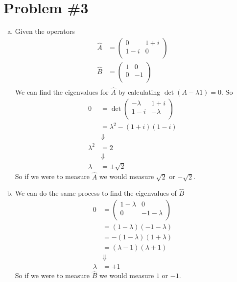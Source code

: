 \documentclass[11pt]{article}
\numberwithin{equation}{section}
\begin{document}
\section{Problem \#3}
\begin{enumerate}[(a)]
\item
Given the operators
\begin{align*}
\hat{A} &= \left(\begin{array}{cc}
              0     &1+i\\
              1-i   &0  \\
           \end{array}\right)\\
\hat{B} &= \left(\begin{array}{cc}
              1     &0\\
              0     &-1\\
           \end{array}\right)\\
\end{align*}
We can find the eigenvalues for $\hat{A}$ by calculating $\det(A-\lambda1) = 0$. So 
\begin{align*}
0 &= \det\left(\begin{array}{cc}
              -\lambda     &1+i\\
              1-i   &-\lambda  \\
           \end{array}\right)\\
&= \lambda^2 - (1+i)(1-i)\\
&\Downarrow\\
\lambda^2 &= 2\\
&\Downarrow\\
\lambda &= \pm\sqrt{2}
\end{align*}
So if we were to measure $\hat{A}$ we would measure $\sqrt{2}$ or $-\sqrt{2}$.

\item
We can do the same process to find the eigenvalues of $\hat{B}$
\begin{align*}
0 &= \left(\begin{array}{cc}
              1-\lambda     &0\\
              0     &-1-\lambda\\
           \end{array}\right)\\
&=(1-\lambda)(-1-\lambda)\\
&=-(1-\lambda)(1+\lambda)\\
&=(\lambda-1)(\lambda+1)\\
&\Downarrow\\
\lambda &= \pm 1
\end{align*}
So if we were to measure $\hat{B}$ we would measure $1$ or $-1$.


\end{enumerate}
\end{document}
